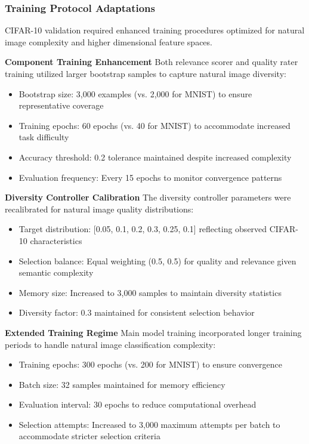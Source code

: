 \documentclass[12pt]{article}
\begin{document}
\subsubsection{Training Protocol Adaptations}\label{training-protocol}

CIFAR-10 validation required enhanced training procedures optimized for natural image complexity and higher dimensional feature spaces.

\textbf{Component Training Enhancement}
Both relevance scorer and quality rater training utilized larger bootstrap samples to capture natural image diversity:

\begin{itemize}
\item Bootstrap size: 3,000 examples (vs. 2,000 for MNIST) to ensure representative coverage
\item Training epochs: 60 epochs (vs. 40 for MNIST) to accommodate increased task difficulty
\item Accuracy threshold: 0.2 tolerance maintained despite increased complexity
\item Evaluation frequency: Every 15 epochs to monitor convergence patterns
\end{itemize}

\textbf{Diversity Controller Calibration}
The diversity controller parameters were recalibrated for natural image quality distributions:

\begin{itemize}
\item Target distribution: [0.05, 0.1, 0.2, 0.3, 0.25, 0.1] reflecting observed CIFAR-10 characteristics
\item Selection balance: Equal weighting (0.5, 0.5) for quality and relevance given semantic complexity
\item Memory size: Increased to 3,000 samples to maintain diversity statistics
\item Diversity factor: 0.3 maintained for consistent selection behavior
\end{itemize}

\textbf{Extended Training Regime}
Main model training incorporated longer training periods to handle natural image classification complexity:

\begin{itemize}
\item Training epochs: 300 epochs (vs. 200 for MNIST) to ensure convergence
\item Batch size: 32 samples maintained for memory efficiency
\item Evaluation interval: 30 epochs to reduce computational overhead
\item Selection attempts: Increased to 3,000 maximum attempts per batch to accommodate stricter selection criteria
\end{itemize}
\end{document}
